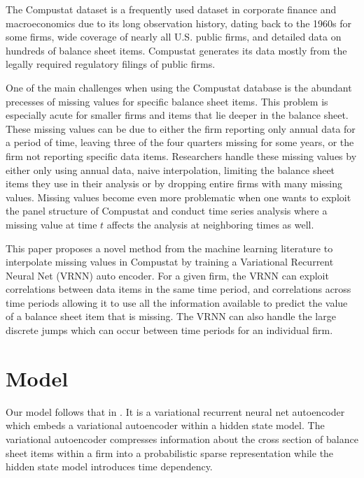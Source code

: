 \documentclass[12pt]{article}
\begin{document}
The Compustat dataset is a frequently used dataset in corporate finance and macroeconomics due to its
long observation history, dating back to the 1960s for some firms, wide coverage of nearly all U.S. 
public firms, and detailed data on hundreds of balance sheet items. Compustat generates its data mostly from 
the legally required regulatory filings of public firms. 

One of the main challenges when 
using the Compustat database is the abundant precesses of missing values for specific balance sheet items. 
This problem is especially acute for smaller firms and items that lie deeper in the balance sheet. These missing 
values can be due to either the firm reporting only annual data for a period of time, leaving three of the four quarters
missing for some years, or the firm not reporting specific data items. Researchers handle these missing values by either 
only using annual data, naive interpolation, limiting the balance sheet items they use in their analysis or by dropping
entire firms with many missing values. Missing values become even more problematic when one wants to exploit the panel 
structure of Compustat and conduct time series analysis where a missing value at time $t$ affects the analysis at neighboring 
times as well.

This paper proposes a novel method from the machine learning literature to interpolate missing values in Compustat by 
training a Variational Recurrent Neural Net (VRNN) auto encoder. For a given firm, the VRNN can exploit correlations between data items in the same
time period, and correlations across time periods allowing it to use all the information available to predict the value of a 
balance sheet item that is missing. The VRNN can also handle the large discrete jumps which can occur between time periods for an
individual firm. 




\section{Model}

Our model follows that in \cite{juny/etal:corr:2015}. It is a variational recurrent neural net autoencoder which
embeds a variational autoencoder within a hidden state model. The variational autoencoder compresses information about
the cross section of balance sheet items within a firm into a probabilistic sparse representation while the hidden 
state model introduces time dependency. 
\end{document}

